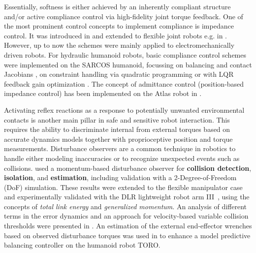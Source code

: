 Essentially, softness is either achieved by an inherently compliant structure \cite{PrattWil1995,BicchiTon2002} and/or active compliance control via high-fidelity joint torque feedback. 
One of the most prominent control concepts to implement compliance is impedance control.
It was introduced in \cite{Hogan1985} and extended to flexible joint robots e.g. in \cite{Albu-SchaefferOttHir2007,Ott2008}. 
However, up to now the schemes were mainly applied to electromechanically driven robots.
For hydraulic humanoid robots, basic compliance control schemes were implemented on the SARCOS humanoid, focussing on balancing and contact Jacobians \cite{Hyon2007SARCOScompliance}, on constraint handling via quadratic programming \cite{HerzogRigGriPas2014} or with LQR feedback gain optimization \cite{MasonRigSch2014}. 
The concept of admittance control (position-based impedance control) has been implemented on the Atlas robot in \cite{Lee2014atlasadmittance}.

Activating reflex reactions as a response to potentially unwanted environmental contacts is another main pillar in safe and sensitive robot interaction.
This requires the ability to discriminate internal from external torques based on accurate dynamics models together with proprioceptive position and torque measurements.
Disturbance observers are a common technique in robotics to handle either modeling inaccuracies \cite{Oh1999,NikoobinHag2008} or to recognize unexpected events such as collisions.
\cite{LucaMat2005} used a momentum-based disturbance observer for \textbf{collision detection}, \textbf{isolation}, and \textbf{estimation}, including validation with a 2-Degree-of-Freedom (DoF) simulation.
These results were extended to the flexible manipulator case and experimentally validated with the DLR lightweight robot arm III~\cite{DeLucaAlbHadHir2006}, using the concepts of \emph{total link energy} and \emph{generalized momentum}.
An analysis of different terms in the error dynamics and an approach for velocity-based variable collision thresholds were presented in \cite{SotoudehnejadKer2014}.
An estimation of the external end-effector wrenches based on observed disturbance torques was used in \cite{OttHenLee2013} to enhance a model predictive balancing controller on the humanoid robot TORO.

